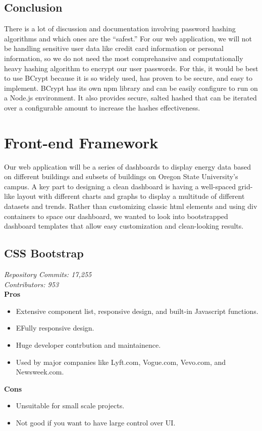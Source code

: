 \documentclass[onecolumn, draftclsnofoot,10pt, compsoc]{IEEEtran}
\begin{document}
\subsection{Conclusion}
There is a lot of discussion and documentation involving password hashing algorithms and which ones are the ``safest.'' For our web application, we will not be handling sensitive user data like credit card information or personal information, so we do not need the most comprehansive and computationally heavy hashing algorithm to encrypt our user passwords. For this, it would be best to use BCrypt because it is so widely used, has proven to be secure, and easy to implement. BCrypt has its own npm library and can be easily configure to run on a Node.js environment. It also provides secure, salted hashed that can be iterated over a configurable amount to increase the hashes effectiveness.
\section{Front-end Framework}
Our web application will be a series of dashboards to display energy data based on different buildings and subsets of buildings on Oregon State University's campus. A key part to designing a clean dashboard is having a well-spaced grid-like layout with different charts and graphs to display a multitude of different datasets and trends. Rather than customizing classic html elements and using div containers to space our dashboard, we wanted to look into bootstrapped dashboard templates that allow easy customization and clean-looking results. 
\subsection{CSS Bootstrap}
\textit{Repository Commits: 17,255}\\ 
\textit{Contributors: 953}\\
\textbf{Pros}
\begin{itemize}
    \item Extensive component list, responsive design, and built-in Javascript functions.\cite{puranjay_2015}
    \item EFully responsive design.
    \item Huge developer contrbution and maintainence.
    \item Used by major companies like Lyft.com, Vogue.com, Vevo.com, and Newsweek.com. \cite{puranjay_2015}
\end{itemize}
\textbf{Cons}
\begin{itemize}
    \item Unsuitable for small scale projects. \cite{puranjay_2015}
    \item Not good if you want to have large control over UI.
    
\end{itemize}
\end{document}
